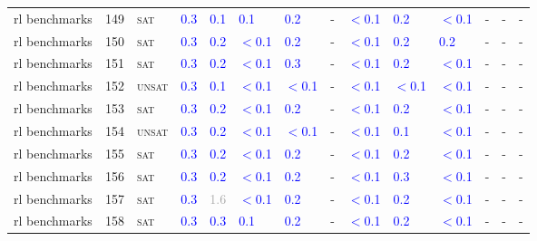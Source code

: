 \begin{center}
{\begin{longtable}{@{}llllllllllllll@{}}
rl benchmarks & 149 & \textsc{sat} & \textcolor{blue}{0.3} & \textcolor{blue}{0.1} & \textcolor{blue}{0.1} & \textcolor{blue}{0.2} & - & \textcolor{blue}{$<$0.1} & \textcolor{blue}{0.2} & \textcolor{blue}{$<$0.1} & - & - & - \\
rl benchmarks & 150 & \textsc{sat} & \textcolor{blue}{0.3} & \textcolor{blue}{0.2} & \textcolor{blue}{$<$0.1} & \textcolor{blue}{0.2} & - & \textcolor{blue}{$<$0.1} & \textcolor{blue}{0.2} & \textcolor{blue}{0.2} & - & - & - \\
rl benchmarks & 151 & \textsc{sat} & \textcolor{blue}{0.3} & \textcolor{blue}{0.2} & \textcolor{blue}{$<$0.1} & \textcolor{blue}{0.3} & - & \textcolor{blue}{$<$0.1} & \textcolor{blue}{0.2} & \textcolor{blue}{$<$0.1} & - & - & - \\
rl benchmarks & 152 & \textsc{unsat} & \textcolor{blue}{0.3} & \textcolor{blue}{0.1} & \textcolor{blue}{$<$0.1} & \textcolor{blue}{$<$0.1} & - & \textcolor{blue}{$<$0.1} & \textcolor{blue}{$<$0.1} & \textcolor{blue}{$<$0.1} & - & - & - \\
rl benchmarks & 153 & \textsc{sat} & \textcolor{blue}{0.3} & \textcolor{blue}{0.2} & \textcolor{blue}{$<$0.1} & \textcolor{blue}{0.2} & - & \textcolor{blue}{$<$0.1} & \textcolor{blue}{0.2} & \textcolor{blue}{$<$0.1} & - & - & - \\
rl benchmarks & 154 & \textsc{unsat} & \textcolor{blue}{0.3} & \textcolor{blue}{0.2} & \textcolor{blue}{$<$0.1} & \textcolor{blue}{$<$0.1} & - & \textcolor{blue}{$<$0.1} & \textcolor{blue}{0.1} & \textcolor{blue}{$<$0.1} & - & - & - \\
rl benchmarks & 155 & \textsc{sat} & \textcolor{blue}{0.3} & \textcolor{blue}{0.2} & \textcolor{blue}{$<$0.1} & \textcolor{blue}{0.2} & - & \textcolor{blue}{$<$0.1} & \textcolor{blue}{0.2} & \textcolor{blue}{$<$0.1} & - & - & - \\
rl benchmarks & 156 & \textsc{sat} & \textcolor{blue}{0.3} & \textcolor{blue}{0.2} & \textcolor{blue}{$<$0.1} & \textcolor{blue}{0.2} & - & \textcolor{blue}{$<$0.1} & \textcolor{blue}{0.3} & \textcolor{blue}{$<$0.1} & - & - & - \\
rl benchmarks & 157 & \textsc{sat} & \textcolor{blue}{0.3} & \textcolor{darkgray}{1.6} & \textcolor{blue}{$<$0.1} & \textcolor{blue}{0.2} & - & \textcolor{blue}{$<$0.1} & \textcolor{blue}{0.2} & \textcolor{blue}{$<$0.1} & - & - & - \\
rl benchmarks & 158 & \textsc{sat} & \textcolor{blue}{0.3} & \textcolor{blue}{0.3} & \textcolor{blue}{0.1} & \textcolor{blue}{0.2} & - & \textcolor{blue}{$<$0.1} & \textcolor{blue}{0.2} & \textcolor{blue}{$<$0.1} & - & - & - \\

\end{longtable}}
\end{center}
